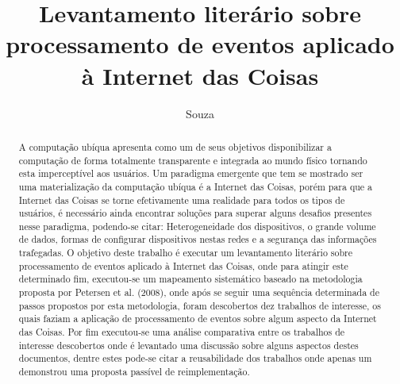 \documentclass[ti,table]{texufpel} %
\title{Levantamento literário sobre processamento de eventos aplicado à Internet das Coisas}
\author{Souza}{Weslen Schiavon}
\begin{document}
 

  

\renewcommand{\advisorname}{Orientadora}           %

\renewcommand{\coadvisorname}{Coorientador}      %

  

\maketitle  

  

\sloppy 

  


  

  

\begin{abstract} 

A computação ubíqua apresenta como um de seus objetivos disponibilizar a computação de forma totalmente transparente e integrada ao mundo físico tornando esta imperceptível aos usuários. Um paradigma emergente que tem se mostrado ser uma materialização da computação ubíqua é a Internet das Coisas, porém para que a Internet das Coisas se torne efetivamente uma realidade para todos os tipos de usuários, é necessário ainda encontrar soluções para superar alguns desafios presentes nesse paradigma, podendo-se citar: Heterogeneidade dos dispositivos, o grande volume de dados, formas de configurar dispositivos nestas redes e a segurança das informações trafegadas. O objetivo deste trabalho é executar um levantamento literário sobre processamento de eventos aplicado à Internet das Coisas, onde para atingir este determinado fim, executou-se um mapeamento sistemático baseado na metodologia proposta por Petersen et al. (2008), onde após se seguir uma sequência determinada de passos propostos por esta metodologia, foram descobertos dez trabalhos de interesse, os quais faziam a aplicação de processamento de eventos sobre algum aspecto da Internet das Coisas. Por fim executou-se uma análise comparativa entre os trabalhos de interesse descobertos onde é levantado uma discussão sobre alguns aspectos destes documentos, dentre estes pode-se citar a reusabilidade dos trabalhos onde apenas um demonstrou uma proposta passível de reimplementação. 

\end{abstract} 

  
\end{document}
